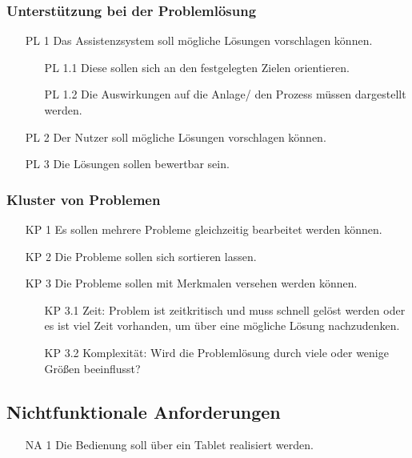 \subsubsection*{Unterstützung bei der Problemlösung}
\begin{itemize}
\item[PL 1] Das Assistenzsystem soll mögliche Lösungen vorschlagen können.
	\begin{itemize}
	\item[PL 1.1] Diese sollen sich an den festgelegten Zielen orientieren.
	\item[PL 1.2] Die Auswirkungen auf die Anlage/ den Prozess müssen dargestellt werden.
	\end{itemize}
\item[PL 2] Der Nutzer soll mögliche Lösungen vorschlagen können.
\item[PL 3] Die Lösungen sollen bewertbar sein.
\end{itemize}

\subsubsection*{Kluster von Problemen}
\begin{itemize}
\item[KP 1] Es sollen mehrere Probleme gleichzeitig bearbeitet werden können.
\item[KP 2] Die Probleme sollen sich sortieren lassen.
\item[KP 3] Die Probleme sollen mit Merkmalen versehen werden können.
	\begin{itemize}
	\item[KP 3.1] Zeit: Problem ist zeitkritisch und muss schnell gelöst werden oder es ist viel Zeit vorhanden, um über eine mögliche Lösung nachzudenken.
	\item[KP 3.2] Komplexität: Wird die Problemlösung durch viele oder wenige Größen beeinflusst?
	\end{itemize}
\end{itemize}

\subsection{Nichtfunktionale Anforderungen}
\begin{itemize}
\item[NA 1] Die Bedienung soll über ein Tablet realisiert werden.
\end{itemize}
